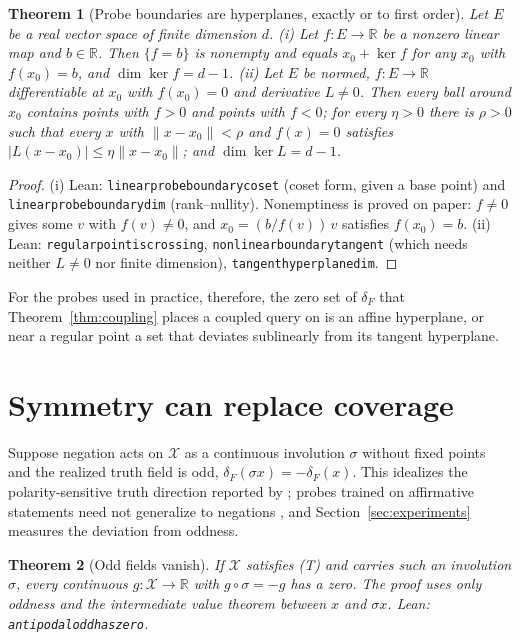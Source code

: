 \documentclass[10pt]{article}
\newtheorem{theorem}{Theorem}
\theoremstyle{definition}
\theoremstyle{remark}
\newcommand{\X}{\mathcal{X}}
\newcommand{\R}{\mathbb{R}}
\newcommand{\dF}{\delta_{\!F}}
\newcommand{\leanid}[1]{{\def\_{\textunderscore\allowbreak}\texttt{#1}}}
\begin{document}
\begin{theorem}[Probe boundaries are hyperplanes, exactly or to first order]
\label{thm:hyperplane}
Let $E$ be a real vector space of finite dimension $d$.
(i) Let $f:E\to\R$ be a nonzero linear map and $b\in\R$. Then
$\{f=b\}$ is nonempty and equals $x_0+\ker f$ for any $x_0$ with
$f(x_0)=b$, and $\dim\ker f=d-1$.
(ii) Let $E$ be normed, $f:E\to\R$ differentiable at $x_0$ with
$f(x_0)=0$ and derivative $L\ne0$. Then every ball around $x_0$ contains
points with $f>0$ and points with $f<0$; for every $\eta>0$ there is
$\rho>0$ such that every $x$ with $\|x-x_0\|<\rho$ and $f(x)=0$
satisfies $|L(x-x_0)|\le\eta\|x-x_0\|$; and $\dim\ker L=d-1$.
\end{theorem}
\begin{proof}
(i) Lean: \leanid{linear\_probe\_boundary\_coset} (coset form, given a
base point) and \leanid{linear\_probe\_boundary\_dim} (rank--nullity).
Nonemptiness is proved on paper: $f\ne0$ gives some $v$ with $f(v)\ne0$,
and $x_0=(b/f(v))\,v$ satisfies $f(x_0)=b$. (ii) Lean:
\leanid{regular\_point\_is\_crossing},
\leanid{nonlinear\_boundary\_tangent} (which needs neither $L\ne0$ nor
finite dimension), \leanid{tangent\_hyperplane\_dim}.
\end{proof}

For the probes used in practice, therefore, the zero set of $\dF$ that
Theorem~\ref{thm:coupling} places a coupled query on is an affine
hyperplane, or near a regular point a set that deviates sublinearly from
its tangent hyperplane.

\section{Symmetry can replace coverage}
\label{sec:antipodal}

Suppose negation acts on $\X$ as a continuous involution $\sigma$ without
fixed points and the realized truth field is odd,
$\dF(\sigma x)=-\dF(x)$. This idealizes the polarity-sensitive truth
direction reported by \citet{burger2024truth}; probes trained on
affirmative statements need not generalize to negations
\citep{levinstein2024still}, and Section~\ref{sec:experiments} measures
the deviation from oddness.

\begin{theorem}[Odd fields vanish]
\label{thm:odd-zero}
If $\X$ satisfies (T) and carries such an involution $\sigma$, every
continuous $g:\X\to\R$ with $g\circ\sigma=-g$ has a zero. The proof uses
only oddness and the intermediate value theorem between $x$ and
$\sigma x$. Lean: \leanid{antipodal\_odd\_has\_zero}.
\end{theorem}
\end{document}
